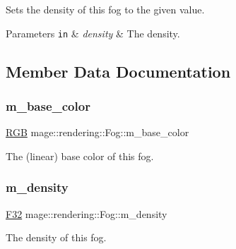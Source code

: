 Sets the density of this fog to the given value.


\begin{DoxyParams}[1]{Parameters}
\mbox{\tt in}  & {\em density} & The density. \\
\hline
\end{DoxyParams}


\subsection{Member Data Documentation}
\mbox{\label{classmage_1_1rendering_1_1_fog_a5f7d0bcb79a1d68b2456bd005db48a99}} 
\subsubsection{\texorpdfstring{m\+\_\+base\+\_\+color}{m\_base\_color}}
{\footnotesize\ttfamily \mbox{\hyperlink{structmage_1_1_r_g_b}{R\+GB}} mage\+::rendering\+::\+Fog\+::m\+\_\+base\+\_\+color\hspace{0.3cm}{\ttfamily [private]}}

The (linear) base color of this fog. \mbox{\label{classmage_1_1rendering_1_1_fog_aa7a402ad9eef0e9916bb9f83751ebe32}} 
\subsubsection{\texorpdfstring{m\+\_\+density}{m\_density}}
{\footnotesize\ttfamily \mbox{\hyperlink{namespacemage_aa97e833b45f06d60a0a9c4fc22ae02c0}{F32}} mage\+::rendering\+::\+Fog\+::m\+\_\+density\hspace{0.3cm}{\ttfamily [private]}}

The density of this fog. 